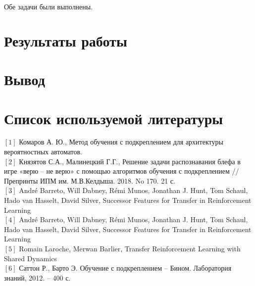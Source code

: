 \documentclass[12pt, a4paper]{report}
\theoremstyle{definition}
\theoremstyle{plain}
\theoremstyle{remark}
\theoremstyle{remark}
\theoremstyle{definition}
\begin{document}
Обе задачи были выполнены. 

\section{Результаты работы}
\section{Вывод}

\newpage
\section{Список используемой литературы} 
$[1]$ Комаров А. Ю., Метод обучения с подкреплением для архитектуры вероятностных автоматов.\\
$[2]$ Князятов С.А., Малинецкий Г.Г.,
Решение задачи распознавания блефа в игре «верю – не верю» с помощью алгоритмов
обучения с подкреплением // Препринты ИПМ им. М.В.Келдыша. 2018. No 170. 21 с.\\
$[3]$ André Barreto, Will Dabney, Rémi Munos, Jonathan J. Hunt,
Tom Schaul, Hado van Hasselt, David Silver, Successor Features for
Transfer in Reinforcement Learning \\
$[4]$ André Barreto, Will Dabney, Rémi Munos, Jonathan J. Hunt,
Tom Schaul, Hado van Hasselt, David Silver, Successor Features for
Transfer in Reinforcement Learning \\
$[5]$ Romain Laroche, Merwan Barlier, Transfer Reinforcement Learning with Shared Dynamics \\
$[6]$ Саттон Р., Барто Э. Обучение с подкреплением – Бином. Лаборатория знаний,
2012. – 400 с.
\end{document}
